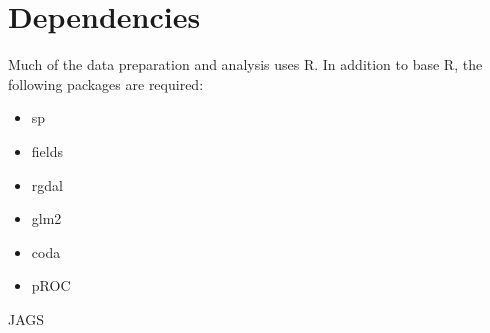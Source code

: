 \documentclass[11pt]{article}
\begin{document}
\section{Dependencies}
Much of the data preparation and analysis uses R. In addition to base R, the following packages are required:
\begin{itemize}
	\item sp
	\item fields
	\item rgdal
	\item glm2
	\item coda
	\item pROC
\end{itemize}

JAGS
\end{document}
